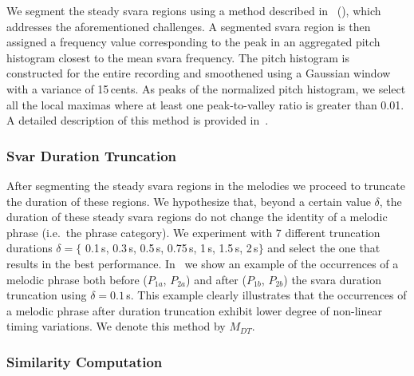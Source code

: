 We segment the steady \gls{svara} regions using a method described in~\cite{gulati2014Landmark} (), which addresses the aforementioned challenges. A segmented \gls{svara} region is then assigned a frequency value corresponding to the peak in an aggregated pitch histogram closest to the mean \gls{svara} frequency. The pitch histogram is constructed for the entire recording and smoothened using a Gaussian window with a variance of 15\,cents. As peaks of the normalized pitch histogram, we select all the local maximas where at least one peak-to-valley ratio is greater than 0.01. A detailed description of this method is provided in~.
 
\subsubsection{Svar Duration Truncation}
\label{sec:patterns_improving_similarity_svara_duration_trucation}

After segmenting the steady \gls{svara} regions in the melodies we proceed to truncate the duration of these regions. We hypothesize that, beyond a certain value $\delta$, the duration of these steady \gls{svara} regions do not change the identity of a melodic phrase (i.e.~the phrase category). We experiment with 7 different truncation durations $\delta = \lbrace$ 0.1\,s, 0.3\,s, 0.5\,s, 0.75\,s, 1\,s, 1.5\,s, 2\,s$\rbrace$ and select the one that results in the best performance. In~
we show an example of the occurrences of a melodic phrase both before ($P_{1a}$, $P_{2a}$) and after ($P_{1b}$, $P_{2b}$) the \gls{svara} duration truncation using $\delta = 0.1$\,s. This example clearly illustrates that the occurrences of a melodic phrase after duration truncation exhibit lower degree of non-linear timing variations. We denote this method by $M_{DT}$.

\subsubsection{Similarity Computation}
\label{sec:patterns_improving_similarity_similarity_computation}

